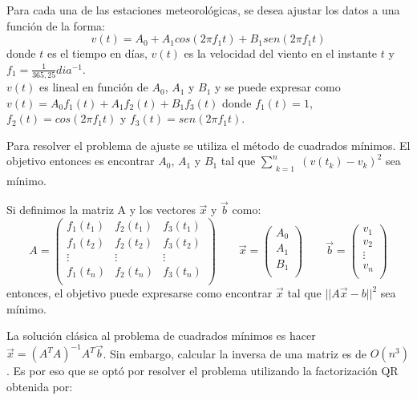 \documentclass[journal, monochrome]{IEEEtran}
\begin{document}
\par
Para cada una de las estaciones meteorológicas, se desea ajustar los datos a una función de la forma:
\begin{equation}
v(t) = A_{0} + A_{1}cos(2\pi f_{1}t) + B_{1}sen(2\pi f_{1}t)
\label{equation:model}
\end{equation}
donde $t$ es el tiempo en días, $v(t)$ es la velocidad del viento en el instante $t$ y $f_{1} = \frac{1}{365,25} dia^{-1}$. \\
$v(t)$ es lineal en función de $A_{0}$, $A_{1}$ y $B_{1}$ y se puede expresar como $v(t) = A_{0}f_{1}(t) + A_{1}f_{2}(t) + B_{1}f_{3}(t)$ donde $f_{1}(t) = 1$, $f_{2}(t) = cos(2\pi f_{1}t)$ y $f_{3}(t) = sen(2\pi f_{1}t)$.
\par
Para resolver el problema de ajuste se utiliza el método de cuadrados mínimos. El objetivo entonces es encontrar $A_{0}$, $A_{1}$ y $B_{1}$ tal que 
$\displaystyle\sum_{\substack{k=1}}^{n} (v(t_{k})- v_{k})^{2} $ sea mínimo.
\par
Si definimos la matriz A y los vectores $\vec{x}$ y $\vec{b}$ como:
\begin{equation}
A = \left(\begin{array}{ccc}
f_{1}(t_{1}) & f_{2}(t_{1}) & f_{3}(t_{1}) \\
f_{1}(t_{2}) & f_{2}(t_{2}) & f_{3}(t_{2}) \\
\vdots & \vdots & \vdots \\
f_{1}(t_{n}) & f_{2}(t_{n}) & f_{3}(t_{n}) \\
\end{array} \right) \qquad
\vec{x} = \left(\begin{array}{c}
A_{0} \\
A_{1} \\
B_{1} \\
\end{array} \right) \qquad
\vec{b} = \left(\begin{array}{c}
v_{1} \\
v_{2} \\
\vdots \\
v_{n} \\
\end{array} \right)
\end{equation}
entonces, el objetivo puede expresarse como encontrar $\vec{x}$ tal que $||A\vec{x} - {b}||^{2}$ sea mínimo.
\par
La solución clásica al problema de cuadrados mínimos es hacer $\vec{x} = (A^{T}A)^{-1}A^{T}\vec{b}$. Sin embargo, calcular la inversa de una matriz es de $O(n^{3})$. Es por eso que se optó por resolver el problema utilizando la factorización QR obtenida por:
\end{document}
